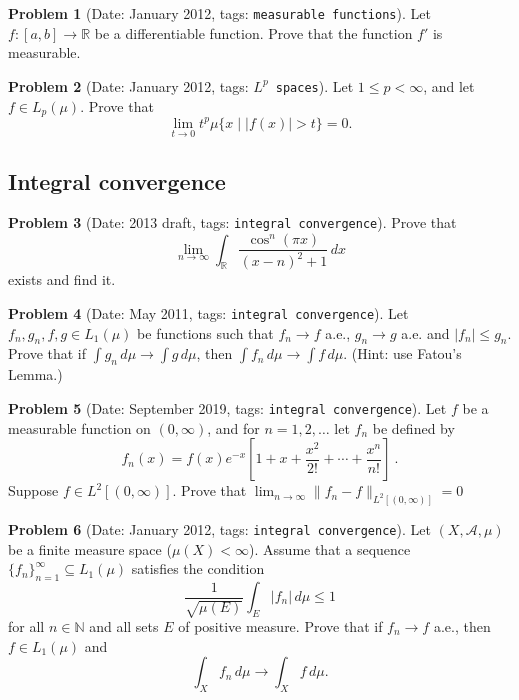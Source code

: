 \documentclass[11pt, notitlepage]{article}
\theoremstyle{definition}
\theoremstyle{definition}
\theoremstyle{definition}
\newtheorem{probstate}{Problem}
\theoremstyle{remark}
\newenvironment{problem}[2]{
    \begin{probstate}[Date: #1, tags: \texttt{#2}]
}
{
  \end{probstate}
}
\newcommand{\R}{\mathbb{R}}
\newcommand{\N}{\mathbb{N}}
\begin{document}
\begin{problem}{January 2012}{measurable functions}
  Let $f : [a,b] \to \R$ be a differentiable function.  Prove that the function $f'$ is measurable.
\end{problem}

\begin{problem}{January 2012}{$L^p$ spaces}
  Let $1 \le p < \infty$, and let $f \in L_p(\mu)$. Prove that
\[
 \lim_{t \to 0} t^p \mu \{x \mid |f(x)|>t \} =0.
\]
\end{problem}

\subsection{Integral convergence}

\begin{problem}{2013 draft}{integral convergence}
Prove that
  \[
   \lim_{n \to \infty} \int_\R \frac{\cos^{n} (\pi  x)}{(x-n)^2+1} \, dx
  \]
  exists and find it.
\end{problem}

\begin{problem}{May 2011}{integral convergence}
  Let $f_n,g_n,f,g \in L_1(\mu)$ be functions such that
    $f_n \to f$ a.e., $g_n \to g$ a.e. and $|f_n| \le g_n$. Prove
    that if $\int g_n \, d \mu \to \int g \, d \mu$, then
    $\int f_n \, d \mu \to \int f \, d \mu$.
    (Hint: use Fatou's Lemma.)
\end{problem}

\begin{problem}{September 2019}{integral convergence}
  Let  $f$ be a measurable function on $(0,\infty)$, and for $n=1,2,\ldots$ let
$f_n$ be defined by
$$
f_n(x)=f(x)e^{-x}\left[1+x+\frac{x^2}{2!}+\cdots+\frac{x^n}{n!}\right] \ .
$$
Suppose $f \in L^2[(0,\infty)]$. Prove that $\lim_{n\to \infty}\|f_n-f\|_{L^2[(0,\infty)]}=0$
\end{problem}

\begin{problem}{January 2012}{integral convergence}
  Let $(X, \mathcal{A}, \mu)$ be a finite measure space ($\mu(X)< \infty$). Assume that a sequence $\{f_n\}_{n=1}^{\infty} \subseteq L_1(\mu)$ satisfies the condition
\[
  \frac{1}{\sqrt{\mu(E)}} \int_E |f_n| \, d\mu \le 1
\]
for all $n \in \N$ and all sets $E$ of positive measure. Prove that if $f_n \to f$ a.e., then $f \in L_1(\mu)$ and
\[
  \int_X f_n \, d \mu \to \int_X f \, d \mu.
 \]
\end{problem}
\end{document}
